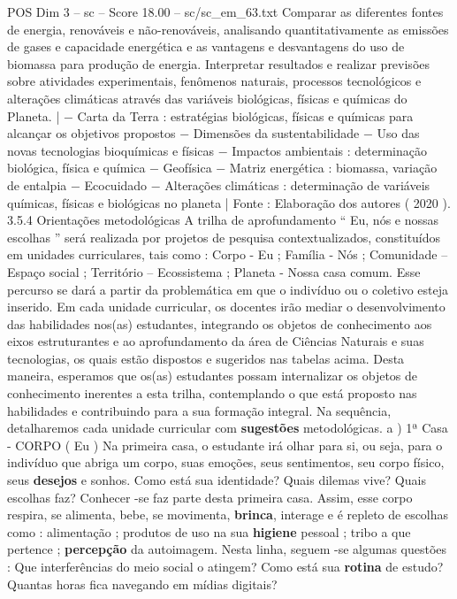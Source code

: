 \begin{textsample}{POS Dim 3 – sc – Score 18.00 – sc/sc\_em\_63.txt}
Comparar as diferentes fontes de energia, renováveis e não-renováveis, analisando quantitativamente as emissões de gases e capacidade energética e as vantagens e desvantagens do uso de biomassa para produção de energia.
Interpretar resultados e realizar previsões sobre atividades experimentais, fenômenos naturais, processos tecnológicos e alterações climáticas através das variáveis biológicas, físicas e químicas do Planeta. | − Carta da Terra : estratégias biológicas, físicas e químicas para alcançar os objetivos propostos − Dimensões da sustentabilidade − Uso das novas tecnologias bioquímicas e físicas − Impactos ambientais : determinação biológica, física e química − Geofísica − Matriz energética : biomassa, variação de entalpia − Ecocuidado − Alterações climáticas : determinação de variáveis químicas, físicas e biológicas no planeta | Fonte : Elaboração dos autores ( 2020 ). 3.5.4 Orientações metodológicas A trilha de aprofundamento “ Eu, nós e nossas escolhas ” será realizada por projetos de pesquisa contextualizados, constituídos em unidades curriculares, tais como : Corpo - Eu ; Família - Nós ; Comunidade – Espaço social ; Território – Ecossistema ; Planeta - Nossa casa comum.
Esse percurso se dará a partir da problemática em que o indivíduo ou o coletivo esteja inserido.
Em cada unidade curricular, os docentes irão mediar o desenvolvimento das habilidades nos(as) estudantes, integrando os objetos de conhecimento aos eixos estruturantes e ao aprofundamento da área de Ciências Naturais e suas tecnologias, os quais estão dispostos e sugeridos nas tabelas acima.
Desta maneira, esperamos que os(as) estudantes possam internalizar os objetos de conhecimento inerentes a esta trilha, contemplando o que está proposto nas habilidades e contribuindo para a sua formação integral.
Na sequência, detalharemos cada unidade curricular com \textbf{sugestões} metodológicas. a ) 1ª Casa - CORPO ( Eu ) Na primeira casa, o estudante irá olhar para si, ou seja, para o indivíduo que abriga um corpo, suas emoções, seus sentimentos, seu corpo físico, seus \textbf{desejos} e sonhos.
Como está sua identidade?
Quais dilemas vive?
Quais escolhas faz?
Conhecer -se faz parte desta primeira casa.
Assim, esse corpo respira, se alimenta, bebe, se movimenta, \textbf{brinca}, interage e é repleto de escolhas como : alimentação ; produtos de uso na sua \textbf{higiene} pessoal ; tribo a que pertence ; \textbf{percepção} da autoimagem.
Nesta linha, seguem -se algumas questões : Que interferências do meio social o atingem?
Como está sua \textbf{rotina} de estudo?
Quantas horas fica navegando em mídias digitais?

\end{textsample}
